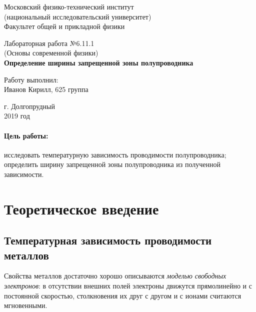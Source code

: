 \documentclass[12pt]{kiarticle}
\begin{document}
	
	\begin{titlepage}
		\begin{center}
			\large 	Московский физико-технический институт \\
			(национальный исследовательский университет) \\
			Факультет общей и прикладной физики \\
			\vspace{0.2cm}
			
			\vspace{4.5cm}
			Лабораторная работа №6.11.1  \\ \vspace{0.2cm}
			\large (Основы современной физики) \\ \vspace{0.2cm}
			\LARGE \textbf{ Определение ширины запрещенной зоны полупроводника  }
		\end{center}
		\vspace{2.3cm} \large
		
		\begin{center}
			Работу выполнил: \\
			Иванов Кирилл,
			625 группа
			\vspace{10mm}		
			
		\end{center}
		
		\begin{center} \vspace{60mm}
			г. Долгопрудный \\
			2019 год
		\end{center}
	\end{titlepage}


	\paragraph*{Цель работы:} исследовать температурную зависимость проводимости полупроводника; определить ширину запрещенной зоны полупроводника из полученной зависимости.
	
	\section{Теоретическое введение }
	\subsection{Температурная зависимость проводимости металлов}
	
	Свойства металлов достаточно хорошо описываются \textit{моделью свободных электронов}: в отсутствии внешних полей электроны движутся прямолинейно и с постоянной скоростью, столкновения их друг с другом и с ионами считаются мгновенными. 
	
\end{document}
